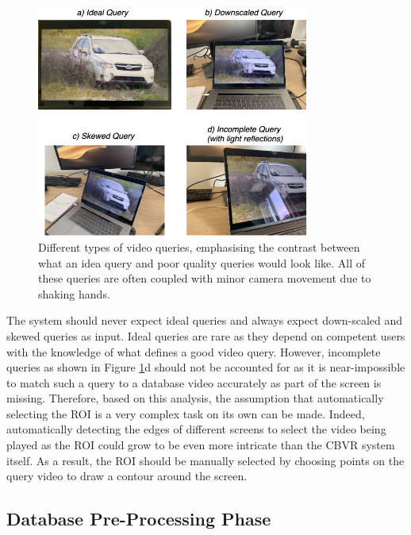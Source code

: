 \begin{figure}[h]
\centerline{\includegraphics[width=0.8\textwidth]{figures/design/difference-query-video-issues.png}}
\caption{\label{fig:difference-query-video-issues}Different types of video queries, emphasising the contrast between what an idea query and poor quality queries would look like. All of these queries are often coupled with minor camera movement due to shaking hands.}
\end{figure}

The system should never expect ideal queries and always expect down-scaled and skewed queries as input. Ideal queries are rare as they depend on competent users with the knowledge of what defines a good video query. However, incomplete queries as shown in Figure \ref{fig:difference-query-video-issues}d should not be accounted for as it is near-impossible to match such a query to a database video accurately as part of the screen is missing. Therefore, based on this analysis, the assumption that automatically selecting the ROI is a very complex task on its own can be made. Indeed, automatically detecting the edges of different screens to select the video being played as the ROI could grow to be even more intricate than the CBVR system itself. As a result, the ROI should be manually selected by choosing points on the query video to draw a contour around the screen. 


\subsection{Database Pre-Processing Phase}

